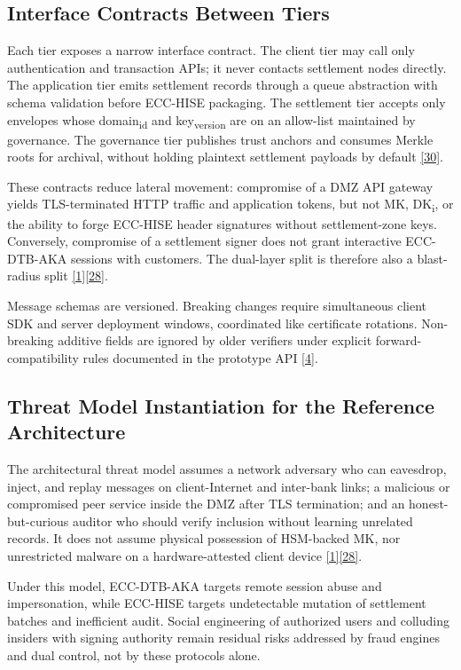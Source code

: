 \subsection{Interface Contracts Between Tiers}

\indent Each tier exposes a narrow interface contract. The client tier may call only authentication and transaction APIs; it never contacts settlement nodes directly. The application tier emits settlement records through a queue abstraction with schema validation before ECC-HISE packaging. The settlement tier accepts only envelopes whose domain\textsubscript{id} and key\textsubscript{version} are on an allow-list maintained by governance. The governance tier publishes trust anchors and consumes Merkle roots for archival, without holding plaintext settlement payloads by default \hyperref[ref:30]{[30]}.

\indent These contracts reduce lateral movement: compromise of a DMZ API gateway yields TLS-terminated HTTP traffic and application tokens, but not MK, DK\textsubscript{i}, or the ability to forge ECC-HISE header signatures without settlement-zone keys. Conversely, compromise of a settlement signer does not grant interactive ECC-DTB-AKA sessions with customers. The dual-layer split is therefore also a blast-radius split \hyperref[ref:1]{[1]}\hyperref[ref:28]{[28]}.

\indent Message schemas are versioned. Breaking changes require simultaneous client SDK and server deployment windows, coordinated like certificate rotations. Non-breaking additive fields are ignored by older verifiers under explicit forward-compatibility rules documented in the prototype API \hyperref[ref:4]{[4]}.

\subsection{Threat Model Instantiation for the Reference Architecture}

\indent The architectural threat model assumes a network adversary who can eavesdrop, inject, and replay messages on client-Internet and inter-bank links; a malicious or compromised peer service inside the DMZ after TLS termination; and an honest-but-curious auditor who should verify inclusion without learning unrelated records. It does not assume physical possession of HSM-backed MK, nor unrestricted malware on a hardware-attested client device \hyperref[ref:1]{[1]}\hyperref[ref:28]{[28]}.

\indent Under this model, ECC-DTB-AKA targets remote session abuse and impersonation, while ECC-HISE targets undetectable mutation of settlement batches and inefficient audit. Social engineering of authorized users and colluding insiders with signing authority remain residual risks addressed by fraud engines and dual control, not by these protocols alone.

